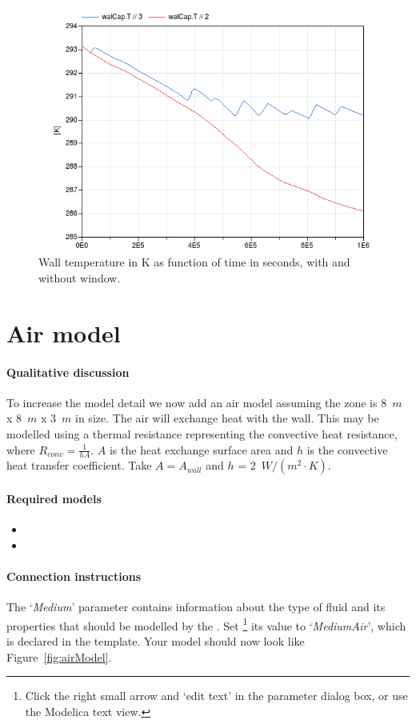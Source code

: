 \documentclass[10pt,a4paper]{article}
\begin{document}
\begin{figure}
\centering
\includegraphics[scale=0.6]{result2.png}
\caption{Wall temperature in K as function of time in seconds,
with and without window.}
\label{fig:res2}
\end{figure}


\section{Air model}
\paragraph{Qualitative discussion}
To increase the model detail we now add
an air model assuming the zone is 8~$m$ x 8~$m$ x 3~$m$ in size.
The air will exchange heat with the wall.
This may be modelled using a thermal resistance representing the convective heat resistance,
where $R_{conv}=\frac{1}{hA}$. $A$ is the heat exchange 
surface area and $h$ is the convective heat transfer coefficient. Take $A = A_{wall}$ and $h$ = 2~${W/(m^2\cdot K)}$.


\paragraph{Required models}
\begin{itemize}
\item {}
\item {}
\end{itemize}

\paragraph{Connection instructions}
The  `\textit{Medium}' parameter contains
information about the type of fluid and its properties
that should be modelled by the .
Set
\footnote{Click the right small arrow and `edit text' in the parameter dialog box, or use the Modelica text view.}
 its value to `\textit{MediumAir}', which is declared in the template. Your model should now look like Figure~\ref{fig:airModel}.
 
\end{document}
